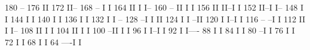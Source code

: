 \begin{Listing}
      180                                                                   --
      176                                                                   II
      172                                                                   II--
      168                                                               --  I  I
      164                                                               II  I  I--
      160                                                           --  II  I    I
      156                                                           II  II--I    I
      152                                                           II--I        I--
      148                                                           I              I
      144                                                           I              I
      140                                                           I              I
      136                                                           I              I
      132                                                           I              I    --
      128                                                         --I              I    II
      124                                                         I                I  --II
      120                                                         I                I--I  I
      116                                                   --  --I                      I
      112                                                   II  I                        I--
      108                                                   II  I                          I
      104                                                   II  I                          I
      100                                                 --II  I                          I
       96                                                 I  I--I                          I
       92                                                 I                                I----
       88                                                 I                                    I
       84                                                 I                                    I
       80                                               --I                                    I
       76                                               I                                      I
       72                                               I                                      I
       68                                               I                                      I
       64                                           ----I                                      I

\end{Listing}
